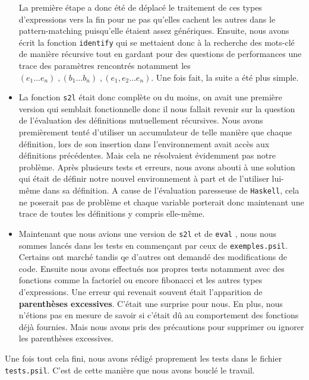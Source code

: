 \documentclass[11pt]{article}
\newcommand{\eval}{\texttt{eval} }
\newcommand{\stol}{\texttt{s2l} }
\begin{document}
\begin{itemize}
	La première étape a donc été de déplacé le traitement de ces types d'expressions vers la fin pour ne pas qu'elles cachent les autres dans le pattern-matching puisqu'elle étaient assez génériques. Ensuite, nous avons écrit la fonction \texttt{identify} qui se mettaient donc à la recherche des mots-clé de manière récursive tout en gardant pour des questions de performances une trace des paramètres rencontrés notamment les $(e_1 \ldots e_n) \;, (b_1 \ldots b_n)\;, (e_1, e_2 \ldots e_n)$. Une fois fait, la suite a été plus simple.
	
	\item La fonction \stol était donc complète ou du moins, on avait une première version qui semblait fonctionnelle donc il nous fallait revenir sur la question de l'évaluation des définitions mutuellement récursives. Nous avons premièrement tenté d'utiliser un accumulateur de telle manière que chaque définition, lors de son insertion dans l'environnement avait accès aux définitions précédentes. Mais cela ne résolvaient évidemment pas notre problème. Après plusieurs tests et erreurs, nous avons abouti à une solution qui était de définir notre nouvel environnement à part et de l'utiliser lui-même dans sa définition. A cause de l'évaluation paresseuse de \texttt{Haskell}, cela ne poserait pas de problème et chaque variable porterait donc maintenant une trace de toutes les définitions y compris elle-même.
	
	\item Maintenant que nous avions une version de \stol et de \eval, nous nous sommes lancés dans les tests en commençant par ceux de \texttt{exemples.psil}. Certains ont marché tandis qe d'autres ont demandé des modifications de code. Ensuite nous avons effectués nos propres tests notamment avec des fonctions comme la factoriel ou encore fibonacci et les autres types d'expressions. Une erreur qui revenait souvent était l'apparition de \textbf{parenthèses excessives}. C'était une surprise pour nous. En plus, nous n'étions pas en mesure de savoir si c'était dû au comportement des fonctions déjà fournies. Mais nous avons pris des précautions pour supprimer ou ignorer les parenthèses excessives.
	
\end{itemize}


Une fois tout cela fini, nous avons rédigé proprement les tests dans le fichier \texttt{tests.psil}. C'est de cette manière que nous avons bouclé le travail.

	
\end{document}
